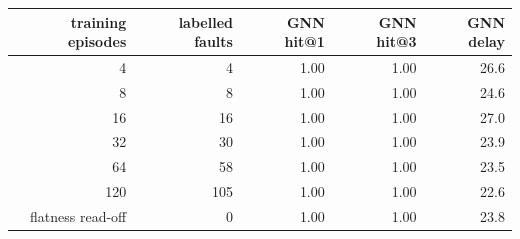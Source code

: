 \begin{center}\small\begin{tabular}{@{}rrrrr@{}}\toprule training episodes & labelled faults & GNN hit@1 & GNN hit@3 & GNN delay \\ \midrule
4 & 4 & 1.00 & 1.00 & 26.6 \\
8 & 8 & 1.00 & 1.00 & 24.6 \\
16 & 16 & 1.00 & 1.00 & 27.0 \\
32 & 30 & 1.00 & 1.00 & 23.9 \\
64 & 58 & 1.00 & 1.00 & 23.5 \\
120 & 105 & 1.00 & 1.00 & 22.6 \\
\midrule
flatness read-off & 0 & 1.00 & 1.00 & 23.8 \\
\bottomrule\end{tabular}\end{center}

